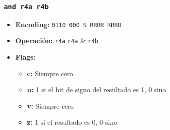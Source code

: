 \documentclass{article}
\begin{document}
\subsubsection{\texttt{and r4a r4b}}
\begin{itemize}
    \item \textbf{Encoding:} \texttt{0110 000 S RRRR RRRR}
    \item \textbf{Operación:} \texttt{r4a} \Leftarrow \texttt{r4a} \& \texttt{r4b}
    \item \textbf{Flags:}
        \begin{itemize}
            \item \textbf{c:} Siempre cero
            \item \textbf{n:} 1 si el bit de signo del resultado es 1, 0 sino
            \item \textbf{v:} Siempre cero
            \item \textbf{z:} 1 si el resultado es 0, 0 sino
        \end{itemize}
\end{itemize}
\end{document}
